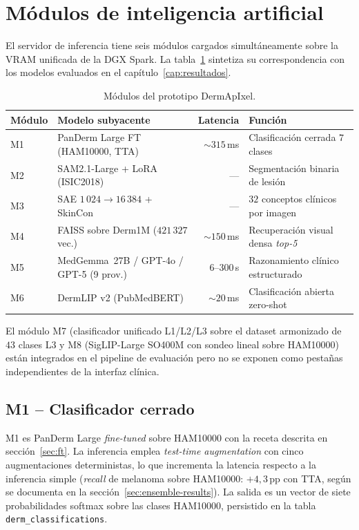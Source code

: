 \section{Módulos de inteligencia artificial}
\label{sec:dermapixel-modulos}

El servidor de inferencia tiene seis módulos cargados
simultáneamente sobre la VRAM unificada de la DGX Spark. La
tabla~\ref{tab:dermapixel-modulos} sintetiza su correspondencia
con los modelos evaluados en el capítulo~\ref{cap:resultados}.

\begin{table}[H]
\centering
\footnotesize
\setlength{\tabcolsep}{3pt}
\renewcommand{\arraystretch}{0.95}
\caption{Módulos del prototipo DermApIxel.}
\label{tab:dermapixel-modulos}
\begin{tabular}{llrl}
\hline
Módulo & Modelo subyacente                       & Latencia & Función \\
\hline
M1     & PanDerm Large FT (HAM10000, TTA)         & $\sim 315$\,ms & Clasificación cerrada $7$ clases \\
M2     & SAM2.1-Large + LoRA (ISIC2018)           & ---            & Segmentación binaria de lesión \\
M3     & SAE $1\,024 \to 16\,384$ + SkinCon       & ---            & $32$ conceptos clínicos por imagen \\
M4     & FAISS sobre Derm1M ($421\,327$ vec.)     & $\sim 150$\,ms & Recuperación visual densa \emph{top-5} \\
M5     & MedGemma~27B / GPT-4o / GPT-5 (9 prov.)  & $6$--$300$\,s  & Razonamiento clínico estructurado \\
M6     & DermLIP v2 (PubMedBERT)                  & $\sim 20$\,ms  & Clasificación abierta zero-shot \\
\hline
\end{tabular}
\end{table}

El módulo M7 (clasificador unificado L1/L2/L3 sobre el dataset
armonizado de $43$ clases L3 y M8 (SigLIP-Large SO400M
con sondeo lineal sobre HAM10000) están integrados en el pipeline
de evaluación pero no se exponen como pestañas independientes de
la interfaz clínica.

\subsection{M1 -- Clasificador cerrado}
\label{sec:dermapixel-m1}

M1 es PanDerm Large \emph{fine-tuned} sobre HAM10000 con la receta
descrita en secci\'on~\ref{sec:ft}. La inferencia emplea \emph{test-time
augmentation} con cinco augmentaciones deterministas, lo que
incrementa la latencia respecto a la inferencia simple
(\emph{recall} de melanoma sobre HAM10000:
$+4{,}3$\,pp con TTA, según se documenta en la
secci\'on~\ref{sec:ensemble-results}). La salida es un vector de siete
probabilidades softmax sobre las clases HAM10000, persistido en la
tabla \texttt{derm\_classifications}.

